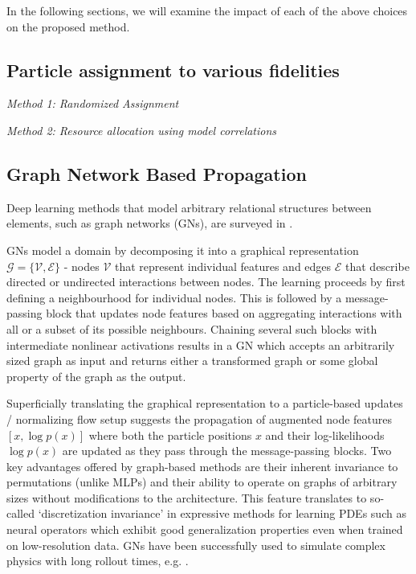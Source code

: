\documentclass[12pt]{article}
\renewcommand{\[}{\left[}
\renewcommand{\]}{\right]}
\renewcommand{\(}{\left(}
\renewcommand{\)}{\right)}
\newcommand{\CE}{\mathcal{E}}
\newcommand{\CG}{\mathcal{G}}
\newcommand{\CV}{\mathcal{V}}
\begin{document}
In the following sections, we will examine the impact of each of the above choices on the proposed method.

\subsection{Particle assignment to various fidelities}

\emph{Method 1: Randomized Assignment}


\noindent \emph{Method 2: Resource allocation using model correlations}

\subsection{Graph Network Based Propagation}
Deep learning methods that model arbitrary relational structures between elements, such as graph networks (GNs), are surveyed in \cite{battaglia_relational_2018}. 

GNs model a domain by decomposing it into a graphical representation $\CG=\{\CV, \CE\}$ - nodes $\CV$ that represent individual features and edges $\CE$ that describe directed or undirected interactions between nodes. 
The learning proceeds by first defining a neighbourhood for individual nodes. This is followed by a message-passing block that updates node features based on aggregating interactions with all or a subset of its possible neighbours. Chaining several such blocks with intermediate nonlinear activations results in a GN which accepts an arbitrarily sized graph as input and returns either a transformed graph or some global property of the graph as the output. 

Superficially translating the graphical representation to a particle-based updates / normalizing flow setup suggests the propagation of augmented node features $[x, \log p(x)]$ where both the particle positions $x$ and their log-likelihoods $\log p(x)$ are updated as they pass through the message-passing blocks. Two key advantages offered by graph-based methods are their inherent invariance to permutations (unlike MLPs) and their ability to operate on graphs of arbitrary sizes without modifications to the architecture. 
This feature translates to so-called `discretization invariance' in expressive methods for learning PDEs such as neural operators \citep{Li2020} which exhibit good generalization properties even when trained on low-resolution data. GNs have been successfully used to simulate complex physics with long rollout times, e.g. \cite{sanchez-gonzalez_learning_2020}.
\end{document}
